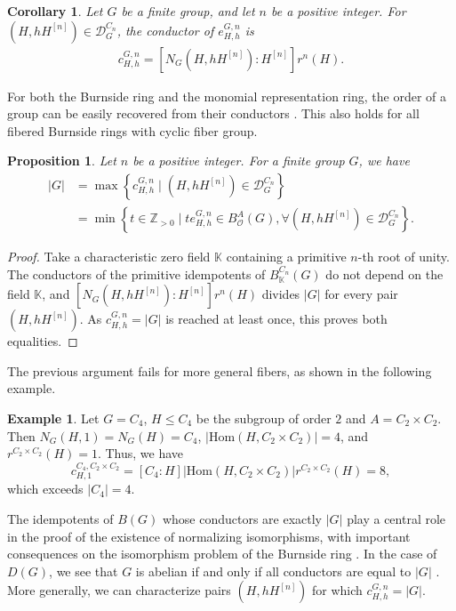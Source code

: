 \documentclass[letterpaper,12pt]{article}
\theoremstyle{plain}
\newtheorem{prop}[theorem]{Proposition}
\newtheorem{cor}[theorem]{Corollary}
\theoremstyle{definition}
\newtheorem{exx}[theorem]{Example}
\newcommand{\Z}{\mathbb{Z}}
\newcommand{\K}{\mathbb{K}}
\newcommand{\BAOG}{B^A_{\mathcal{O}}(G)}
\newcommand{\DnG}{\mathcal{D}^{C_n}_G}
\newcommand{\eGnHh}{e^{G,n}_{H,h}}
\newcommand{\cGnHh}{c^{G,n}_{H,h}}
\begin{document}
\begin{cor}
    Let $G$ be a finite group, and let $n$ be a positive integer. For $\left(H,hH^{[n]}\right)\in \DnG$, the conductor of $\eGnHh$ is
    \begin{align}
        \cGnHh=\left[N_G\left(H,hH^{[n]}\right):H^{[n]}\right]r^n(H).
    \end{align}
\end{cor}

For both the Burnside ring and the monomial representation ring, the order of a group can be easily recovered from their conductors \cite[Proposition 3.7]{Muller}. This also holds for all fibered Burnside rings with cyclic fiber group. 

\begin{prop}
    Let $n$ be a positive integer. For a finite group $G$, we have
    \begin{align*}
        |G| &=\max\left\{\cGnHh\mid \left(H, hH^{[n]}\right)\in \DnG\right\}\\
        &=\min \left\{t\in \Z_{>0} \mid t \eGnHh\in \BAOG, \forall \left(H,hH^{[n]}\right)\in \DnG\right\}.
    \end{align*}
\end{prop}
\begin{proof}
Take a characteristic zero field $\K$ containing a primitive $n$-th root of unity. The conductors of the primitive idempotents of $B^{C_n}_{\K}(G)$ do not depend on the field $\K$, and $\left[N_G\left(H,hH^{[n]}\right):H^{[n]}\right]r^n(H)$ divides $|G|$ for every pair $\left(H,hH^{[n]}\right)$. As $\cGnHh=|G|$ is reached at least once, this proves both equalities.
\end{proof}

The previous argument fails for more general fibers, as shown in the following example.

\begin{exx}
    Let $G=C_4$, $H\leq C_4$ be the subgroup of order $2$ and $A=C_2\times C_2$. Then $N_G(H,1)=N_G(H)=C_4$, $\left|\mathrm{Hom}(H,C_2\times C_2)\right|=4$, and $r^{C_2\times C_2}(H)=1$. Thus, we have
    $$c^{C_4,C_2 \times C_2}_{H,1}=\left[C_4:H\right]\left|\mathrm{Hom}(H,C_2\times C_2)\right|r^{C_2\times C_2} (H)=8,$$
    which exceeds $|C_4|=4$.
\end{exx}

The idempotents of $B(G)$ whose conductors are exactly $|G|$ play a central role in the proof of the existence of normalizing isomorphisms, with important consequences on the isomorphism problem of the Burnside ring \cite{RagVal}. In the case of $D(G)$, we see that $G$ is abelian if and only if all conductors are equal to $|G|$ \cite{Muller}. More generally, we can characterize pairs $\left(H,hH^{[n]}\right)$ for which $\cGnHh=|G|$. 
\end{document}
